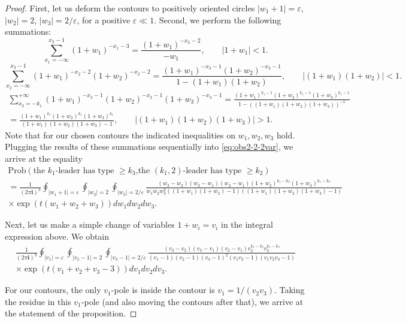 \documentclass[11pt,reqno]{amsart}
\theoremstyle{definition}
\theoremstyle{remark}
\theoremstyle{remark}
\def\geq{\geqslant}
\renewcommand\ge{\geq}
\newcommand{\ii}{{\mathbf i}}
\numberwithin{equation}{section}
\begin{document}
\begin{proof}
		First, let us deform the contours to positively oriented circles $|w_1+1|=\varepsilon$, $|w_2|=2$, $|w_3|=2/\varepsilon$, for a positive $\varepsilon \ll 1$. Second, we perform the following summations:
		$$
		\sum_{x_1=-\infty}^{x_2-1} (1+w_1)^{-x_1-3} = \frac{(1+w_1)^{-x_2-2}}{-w_1}, \qquad \left| 1 + w_1 \right| <1.
		$$
		$$
		\sum_{x_2=-\infty}^{x_3-1} (1+w_1)^{-x_2-2} (1+w_2)^{-x_2-2} = \frac{(1+w_1)^{-x_3-1} (1+w_2)^{-x_3-1} }{1-(1+w_1)(1+w_2)}, \qquad \left| (1 + w_1)(1+w_2) \right| <1.
		$$
		\begin{multline*}
			\sum_{x_3=-k_1}^{+\infty} (1+w_1)^{-x_3-1} (1+w_2)^{-x_3-1} (1+w_3)^{-x_3-1} = \frac{(1+w_1)^{k_1-1} (1+w_2)^{k_1-1} (1+w_3)^{k_1-1} }{1-\left( (1+w_1)(1+w_2)(1+w_3) \right)^{-1}}
			\\ = \frac{(1+w_1)^{k_1} (1+w_2)^{k_1} (1+w_3)^{k_1} }{(1+w_1)(1+w_2)(1+w_3) -1}, \qquad \left| (1 + w_1)(1+w_2)(1+w_3) \right| >1.
		\end{multline*}
		Note that for our chosen contours the indicated inequalities on $w_1,w_2, w_3$ hold. Plugging the results of these summations sequentially into \eqref{eq:obs2-2-2var}, we arrive at the equality
		\begin{multline*}
			\mathrm{Prob} \left( \mbox{the $k_1$-leader has type $\ge k_3$,} \mbox{the $(k_1, 2)$-leader has type $\ge k_2$} \right)
			\\ =
			\frac{1}{(2 \pi \ii)^3} \oint_{|w_1+1|=\varepsilon} \oint_{ |w_2|=2} \oint_{|w_3|=2/\varepsilon} \frac{(w_3-w_2)(w_3-w_1)(w_2-w_1) (1+w_2)^{k_1-k_2} (1+w_3)^{k_1-k_3}}{w_1 w_2 w_3^2 ( (1+w_1)(1+w_2)-1 ) ( (1+w_1)(1+w_2)(1+w_3) -1 ) } \\ \times \exp \left( t(w_1+w_2+w_3) \right) d w_1 dw_2 dw_3.
		\end{multline*}
		
		Next, let us make a simple change of variables $1+w_i=v_i$ in the integral expression above. We obtain
		\begin{multline*}
			\frac{1}{(2 \pi \ii)^3} \oint_{|v_1|=\varepsilon} \oint_{ |v_2-1|=2} \oint_{|v_3-1|=2/\varepsilon} \frac{(v_3-v_2)(v_3-v_1)(v_2-v_1) v_2^{k_1-k_2} v_3^{k_1-k_3}}{(v_1-1) (v_2-1) (v_3-1)^2 ( v_1 v_2 -1 ) ( v_1 v_2 v_3 -1 ) } \\ \times \exp \left( t(v_1+v_2+v_3 - 3) \right) d v_1 d v_2 d v_3.
		\end{multline*}
		
		For our contours, the only $v_1$-pole is inside the contour is $v_1 = 1/(v_2 v_3)$. Taking the residue in this $v_1$-pole (and also moving the contours after that), we arrive at the statement of the proposition. 
		
	\end{proof}
	
\end{document}

